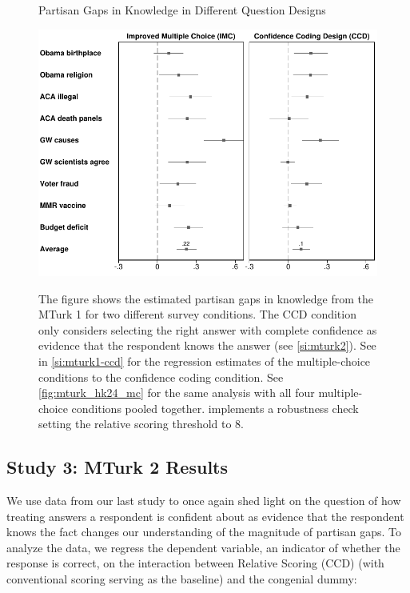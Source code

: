 \documentclass[12pt, letterpaper]{article}
\begin{document}
\begin{center}
	\begin{figure}[ht]
		\centering
		\caption{Partisan Gaps in Knowledge in Different Question Designs}
		\includegraphics[width=.9\textwidth]{../figs/partisan-gap-by-item-arm-14k-24k.pdf}
		\label{fig:mturk_hk24}
		\caption*{\footnotesize
			The figure shows the estimated partisan gaps in knowledge from the MTurk 1 for two different survey conditions. The CCD condition only considers selecting the right answer with complete confidence as evidence that the respondent knows the answer (see \cref{si:mturk2}).
            See  in \cref{si:mturk1-ccd} for the regression estimates of the multiple-choice conditions to the confidence coding condition.
            See \cref{fig:mturk_hk24_mc} for the same analysis with all four multiple-choice conditions pooled together.
             implements a robustness check setting the relative scoring threshold to 8.
		}
	\end{figure}
\end{center}

\subsection*{Study 3: MTurk 2 Results}

We use data from our last study to once again shed light on the question of how treating answers a respondent is confident about as evidence that the respondent knows the fact changes our understanding of the magnitude of partisan gaps. To analyze the data, we regress the dependent variable, an indicator of whether the response is correct, on the interaction between Relative Scoring (CCD) (with conventional scoring serving as the baseline) and the congenial dummy:
\end{document}
